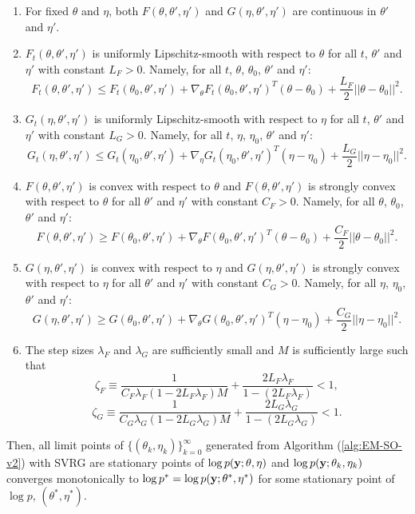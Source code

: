 \begin{theorem}
    \begin{enumerate}
        \item For fixed $\theta$ and $\eta$, both $F(\theta,\theta',\eta')$ and $G(\eta,\theta',\eta')$ are continuous in $\theta'$ and $\eta'.$
        \item $F_t(\theta,\theta',\eta')$ is uniformly Lipschitz-smooth with respect to $\theta$ for all $t$, $\theta'$ and $\eta'$ with constant $L_F > 0$. Namely, for all $t$, $\theta$, $\theta_0$, $\theta'$ and $\eta'$:
        $$F_t(\theta, \theta', \eta') \leq F_t(\theta_0,\theta',  \eta') + \nabla_\theta F_t(\theta_0, \theta',  \eta')^T(\theta-\theta_0) + \frac{L_F}{2} ||\theta - \theta_0||^2.$$ 
        \item $G_t(\eta,\theta',\eta')$ is uniformly Lipschitz-smooth with respect to $\eta$ for all $t$, $\theta'$ and $\eta'$ with constant $L_G > 0$. Namely, for all $t$, $\eta$, $\eta_0$, $\theta'$ and $\eta'$:
        $$G_t(\eta, \theta',  \eta') \leq G_t(\eta_0,\theta',  \eta') + \nabla_\eta G_t(\eta_0,\theta',  \eta')^T(\eta-\eta_0) + \frac{L_G}{2} ||\eta - \eta_0||^2.$$
        \item $F(\theta,\theta',\eta')$ is convex with respect to $\theta$ and $F(\theta,\theta',\eta')$ is strongly convex with respect to $\theta$ for all $\theta'$ and $\eta'$ with constant $C_F > 0$. Namely, for all $\theta$, $\theta_0$, $\theta'$ and $\eta'$:
        $$F(\theta, \theta', \eta') \geq F(\theta_0,\theta',  \eta') + \nabla_\theta F(\theta_0, \theta',  \eta')^T(\theta-\theta_0) + \frac{C_F}{2} ||\theta - \theta_0||^2.$$ 
        \item $G(\eta,\theta',\eta')$ is convex with respect to $\eta$ and $G(\eta,\theta',\eta')$ is strongly convex with respect to $\eta$ for all $\theta'$ and $\eta'$ with constant $C_G > 0$. Namely, for all $\eta$, $\eta_0$, $\theta'$ and $\eta'$:
        $$G(\eta, \theta', \eta') \geq G(\theta_0,\theta',\eta') + \nabla_\theta G(\theta_0, \theta', \eta')^T (\eta-\eta_0) + \frac{C_G}{2} ||\eta - \eta_0||^2.$$ 
        \item The step sizes $\lambda_F$ and $\lambda_G$ are sufficiently small and $M$ is sufficiently large such that 
        $$\zeta_F \equiv \frac{1}{C_F \lambda_F(1-2L_F\lambda_F)M} + \frac{2L_F\lambda_F}{1-(2L_F\lambda_F)} < 1,$$ 
        $$\zeta_G \equiv \frac{1}{C_G \lambda_G(1-2L_G\lambda_G)M} + \frac{2L_G\lambda_G}{1-(2L_G\lambda_G)} < 1.$$
    \end{enumerate}
    
    Then, all limit points of $\{(\theta_k,\eta_k)\}_{k=0}^\infty$ generated from Algorithm (\ref{alg:EM-SO-v2}) with SVRG are stationary points of $\log p(\mathbf{y};\theta,\eta)$ and $\log p(\mathbf{y};\theta_k,\eta_k)$ converges monotonically to $\log p^* = \log p(\mathbf{y};\theta^*,\eta^*)$ for some stationary point of $\log p$, $(\theta^*,\eta^*)$.
\end{theorem}
